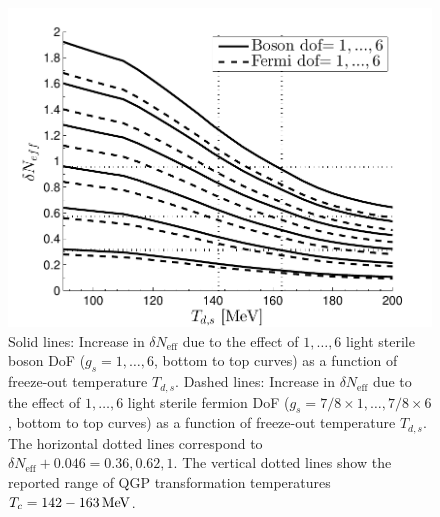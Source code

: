 \begin{figure} 
\centerline{\includegraphics[width=0.9\linewidth]{plots/Neff_Td_combined.pdf}}
\caption{Solid lines: Increase in $\delta N_{\text{eff}}$ due to the effect of $1,\dots,6$ light sterile boson DoF ($g_s=1,\dots,6$, bottom to top curves) as a function of freeze-out temperature $T_{d,s}$. Dashed lines: Increase in $\delta N_{\text{eff}}$ due to the effect of $1,\dots,6$ light sterile fermion DoF ($g_s=7/8\times 1,\dots,7/8\times 6$, bottom to top curves) as a function of freeze-out temperature $T_{d,s}$. The horizontal dotted lines correspond to $\delta N_{\text{eff}}+0.046=0.36,0.62,1$. The vertical dotted lines show the reported range of QGP transformation temperatures $T_c=142-163\text{\,MeV}$. \label{fig:NeffTdZoom}}
\end{figure}


